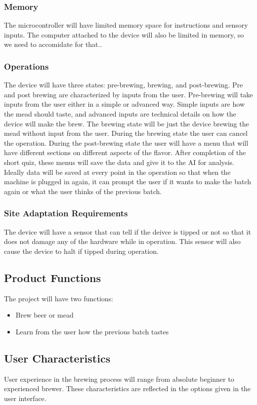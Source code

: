 \documentclass[draftclsnofoot,onecolumn,letterpaper,10pt]{article}
\begin{document}
\subsubsection{Memory}
The microcontroller will have limited memory space for instructions and sensory inputs.
The computer attached to the device will also be limited in memory, so we need to accomidate for that..

\subsubsection{Operations}
The device will have three states: pre-brewing, brewing, and post-brewing.
Pre and post brewing are characterized by inputs from the user.
Pre-brewing will take inputs from the user either in a simple or advanced way.
Simple inputs are how the mead should taste, and advanced inputs are technical details on how the device will make the brew.
The brewing state will be just the device brewing the mead without input from the user.
During the brewing state the user can cancel the operation.
During the post-brewing state the user will have a menu that will have different sections on different aspects of the flavor.
After completion of the short quiz, these menus will save the data and give it to the AI for analysis.
Ideally data will be saved at every point in the operation so that when the machine is plugged in again, it can prompt the user if it wants to make the batch again or what the user thinks of the previous batch.

\subsubsection{Site Adaptation Requirements}
The device will have a sensor that can tell if the deivce is tipped or not so that it does not damage any of the hardware while in operation.
This sensor will also cause the device to halt if tipped during operation.

\subsection{Product Functions}
The project will have two functions:
\begin{itemize}
	\item Brew beer or mead
	\item Learn from the user how the previous batch tastes
\end{itemize}

\subsection{User Characteristics}
User experience in the brewing process will range from absolute beginner to experienced brewer.
These characteristics are reflected in the options given in the user interface.
\end{document}
